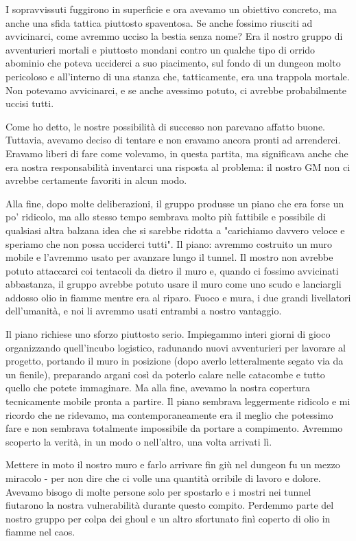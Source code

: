 I sopravvissuti fuggirono in superficie e ora avevamo un obiettivo concreto, ma anche una sfida tattica piuttosto spaventosa. Se anche fossimo riusciti ad avvicinarci, come avremmo ucciso la bestia senza nome? Era il nostro gruppo di avventurieri mortali e piuttosto mondani contro un qualche tipo di orrido abominio che poteva ucciderci a suo piacimento, sul fondo di un dungeon molto pericoloso e all'interno di una stanza che, tatticamente, era una trappola mortale. Non potevamo avvicinarci, e se anche avessimo potuto, ci avrebbe probabilmente uccisi tutti.

Come ho detto, le nostre possibilità di successo non parevano affatto buone. Tuttavia, avevamo deciso di tentare e non eravamo ancora pronti ad arrenderci. Eravamo liberi di fare come volevamo, in questa partita, ma significava anche che era nostra responsabilità inventarci una risposta al problema: il nostro GM non ci avrebbe certamente favoriti in alcun modo.

Alla fine, dopo molte deliberazioni, il gruppo produsse un piano che era forse un po' ridicolo, ma allo stesso tempo sembrava molto più fattibile e possibile di qualsiasi altra balzana idea che si sarebbe ridotta a "carichiamo davvero veloce e speriamo che non possa ucciderci tutti". Il piano: avremmo costruito un muro mobile e l'avremmo usato per avanzare lungo il tunnel. Il mostro non avrebbe potuto attaccarci coi tentacoli da dietro il muro e, quando ci fossimo avvicinati abbastanza, il gruppo avrebbe potuto usare il muro come uno scudo e lanciargli addosso olio in fiamme mentre era al riparo. Fuoco e mura, i due grandi livellatori dell'umanità, e noi li avremmo usati entrambi a nostro vantaggio.

Il piano richiese uno sforzo piuttosto serio. Impiegammo interi giorni di gioco organizzando quell'incubo logistico, radunando nuovi avventurieri per lavorare al progetto, portando il muro in posizione (dopo averlo letteralmente segato via da un fienile), preparando argani così da poterlo calare nelle catacombe e tutto quello che potete immaginare. Ma alla fine, avevamo la nostra copertura tecnicamente mobile pronta a partire. Il piano sembrava leggermente ridicolo e mi ricordo che ne ridevamo, ma contemporaneamente era il meglio che potessimo fare e non sembrava totalmente impossibile da portare a compimento. Avremmo scoperto la verità, in un modo o nell'altro, una volta arrivati lì.

Mettere in moto il nostro muro e farlo arrivare fin giù nel dungeon fu un mezzo miracolo - per non dire che ci volle una quantità orribile di lavoro e dolore. Avevamo bisogo di molte persone solo per spostarlo e i mostri nei tunnel fiutarono la nostra vulnerabilità durante questo compito. Perdemmo parte del nostro gruppo per colpa dei ghoul e un altro sfortunato finì coperto di olio in fiamme nel caos.

